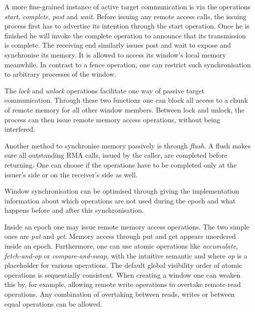 \documentclass[a4paper, 10pt]{article}
\begin{document}
A more fine-grained instance of active target communication is via the operations \emph{start}, \emph{complete}, \emph{post} and \emph{wait}. Before issuing any remote access calls, the issuing process first has to advertise its intention through the start operation. Once he is finished he will invoke the complete operation to announce that its transmission is complete. The receiving end similarly issues post and wait to expose and synchronise its memory. It is allowed to access its window's local memory meanwhile. In contrast to a fence operation, one can restrict such synchronisation to arbitrary processes of the window.

The \emph{lock} and \emph{unlock} operations facilitate one way of passive target communication. Through these two functions one can block all access to a chunk of remote memory for all other window members. Between lock and unlock, the process can then issue remote memory access operations, without being interfered.

Another method to synchronise memory passively is through \emph{flush}. A flush makes sure all outstanding RMA calls, issued by the caller, are completed before returning. One can choose if the operations have to be completed only at the issuer's side or on the receiver's side as well.

Window synchronisation can be optimised through giving the implementation information about which operations are not used during the epoch and what happens before and after this synchronisation.

Inside an epoch one may issue remote memory access operations. The two simple ones are \emph{put} and \emph{get}. Memory access through put and get appears unordered inside an epoch.
Furthermore, one can use atomic operations like \emph{accumulate}, \emph{fetch-and-op} or \emph{compare-and-swap}, with the intuitive semantic and where \emph{op} is a placeholder for various operations. The default global visibility order of atomic operations is sequentially consistent. When creating a window one can weaken this by, for example, allowing remote write operations to overtake remote read operations. Any combination of overtaking between reads, writes or between equal operations can be allowed.
\end{document}
